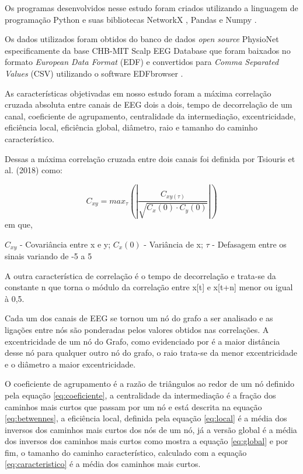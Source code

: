 \documentclass[a4paper,11pt]{article} %
\begin{document}
Os programas desenvolvidos nesse estudo foram criados utilizando a linguagem de programação Python \cite{Foundation2021} e suas bibliotecas NetworkX \cite{NetworkX}, Pandas \cite{Pandas2021} e Numpy \cite{Numpy2021}.

Os dados utilizados foram obtidos do banco de dados \textit{open source} PhysioNet especificamente da base CHB-MIT Scalp EEG Database \cite{Shoeb2009} que foram baixados no formato \textit{European Data Format } (EDF) e convertidos para \textit{Comma Separated Values} (CSV) utilizando o software EDFbrowser \cite{EDFBrowser}.

As características objetivadas em nosso estudo foram a máxima correlação cruzada absoluta entre canais de EEG dois a dois, tempo de decorrelação de um canal, coeficiente de agrupamento, centralidade da intermediação, excentricidade, eficiência local, eficiência global, diâmetro, raio e tamanho do caminho característico. \cite{Tsiouris2018}

Dessas a máxima correlação cruzada entre dois canais foi definida por Tsiouris et al. (2018) como:

\begin{equation} \label{eq:correlacao}
	C_{xy} = max_{\tau}\left(\left|\dfrac{C_{xy(\tau)}}{\sqrt{C_x(0) \cdot C_y(0)}}  \right| \right)
\end{equation}
em que,

$C_{xy}$ - Covariância entre x e y; $C_x(0)$ - Variância de x; $\tau$ - Defasagem entre os sinais variando de -5 a 5

A outra característica de correlação é o tempo de decorrelação e trata-se da constante n que torna o módulo da correlação entre x[t] e x[t+n] menor ou igual à 0,5. \cite{Jeon2019}

Cada um dos canais de EEG se tornou um nó do grafo a ser analisado e as ligações entre nós são ponderadas pelos valores obtidos nas correlações. A excentricidade de um nó do Grafo, como evidenciado por \cite{Urakov2012} é a maior distância desse nó para qualquer outro nó do grafo, o raio trata-se da menor excentricidade e o diâmetro a maior excentricidade. \cite{Urakov2012}

 O coeficiente de agrupamento é a razão de triângulos ao redor de um nó definido pela equação \ref{eq:coeficiente}, a centralidade da intermediação é a fração dos caminhos mais curtos que passam por um nó e está descrita na equação \ref{eq:betwennes}, a eficiência local, definida pela equação \ref{eq:local} é a média dos inversos dos caminhos mais curtos dos nós de um nó, já a versão global é a média dos inversos dos caminhos mais curtos como mostra a equação \ref{eq:global} e por fim, o tamanho do caminho característico, calculado com a equação \ref{eq:caracteristico} é a média dos caminhos mais curtos. \cite{Rubinov2010}
\end{document}
